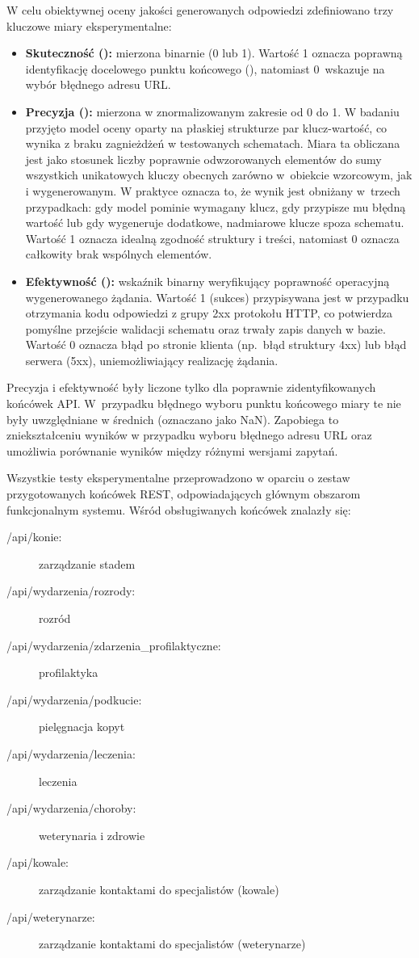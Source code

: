 W celu obiektywnej oceny jakości generowanych odpowiedzi zdefiniowano trzy kluczowe miary eksperymentalne:
\begin{itemize}
    \item \textbf{Skuteczność ():} mierzona binarnie (0 lub 1). Wartość 1 oznacza poprawną identyfikację docelowego punktu końcowego (), natomiast 0~wskazuje na wybór błędnego adresu URL.
    \item \textbf{Precyzja ():} mierzona w znormalizowanym zakresie od 0 do 1. W badaniu przyjęto model oceny oparty na płaskiej strukturze par klucz-wartość, co wynika z braku zagnieżdżeń w testowanych schematach. Miara ta obliczana jest jako stosunek liczby poprawnie odwzorowanych elementów do sumy wszystkich unikatowych kluczy obecnych zarówno w~obiekcie wzorcowym, jak i wygenerowanym. W praktyce oznacza to, że wynik jest obniżany w~trzech przypadkach: gdy model pominie wymagany klucz, gdy przypisze mu błędną wartość lub gdy wygeneruje dodatkowe, nadmiarowe klucze spoza schematu. Wartość 1 oznacza idealną zgodność struktury i treści, natomiast 0 oznacza całkowity brak wspólnych elementów.
    \item \textbf{Efektywność ():} wskaźnik binarny weryfikujący poprawność operacyjną wygenerowanego żądania. Wartość 1 (sukces) przypisywana jest w przypadku otrzymania kodu odpowiedzi z grupy 2xx protokołu HTTP, co potwierdza pomyślne przejście walidacji schematu oraz trwały zapis danych w bazie. Wartość 0 oznacza błąd po stronie klienta (np.~błąd struktury 4xx) lub błąd serwera (5xx), uniemożliwiający realizację żądania.
\end{itemize}


Precyzja i efektywność były liczone tylko dla poprawnie zidentyfikowanych końcówek API. W~przypadku błędnego wyboru punktu końcowego miary te nie były uwzględniane w średnich (oznaczano jako NaN). Zapobiega to zniekształceniu wyników w przypadku wyboru błędnego adresu URL oraz umożliwia porównanie wyników między różnymi wersjami zapytań.

Wszystkie testy eksperymentalne przeprowadzono w oparciu o zestaw przygotowanych końcówek REST, odpowiadających głównym obszarom funkcjonalnym systemu. Wśród obsługiwanych końcówek znalazły się:
\begin{description}
\item[/api/konie:] zarządzanie stadem
\item[/api/wydarzenia/rozrody:] rozród
\item[/api/wydarzenia/zdarzenia\_profilaktyczne:] profilaktyka
\item[/api/wydarzenia/podkucie:] pielęgnacja kopyt
\item[/api/wydarzenia/leczenia:] leczenia
\item[/api/wydarzenia/choroby:] weterynaria i zdrowie
\item[/api/kowale:] zarządzanie kontaktami do specjalistów (kowale)
\item[/api/weterynarze:] zarządzanie kontaktami do specjalistów (weterynarze)
\end{description}

